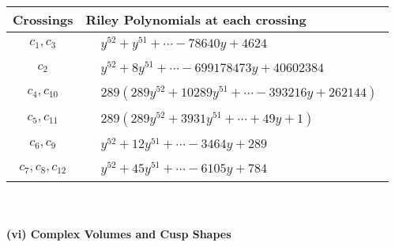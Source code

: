 \documentclass[1p]{elsarticle_modified}
\theoremstyle{definition}
\begin{document}
\begin{tabular}{m{50pt}|m{274pt}}
Crossings & \hspace{64pt}Riley Polynomials at each crossing \\
\hline $$\begin{aligned}c_{1},c_{3}\end{aligned}$$&$\begin{aligned}
&y^{52}+y^{51}+\cdots-78640 y+4624
\end{aligned}$\\
\hline $$\begin{aligned}c_{2}\end{aligned}$$&$\begin{aligned}
&y^{52}+8 y^{51}+\cdots-699178473 y+40602384
\end{aligned}$\\
\hline $$\begin{aligned}c_{4},c_{10}\end{aligned}$$&$\begin{aligned}
&289(289 y^{52}+10289 y^{51}+\cdots-393216 y+262144)
\end{aligned}$\\
\hline $$\begin{aligned}c_{5},c_{11}\end{aligned}$$&$\begin{aligned}
&289(289 y^{52}+3931 y^{51}+\cdots+49 y+1)
\end{aligned}$\\
\hline $$\begin{aligned}c_{6},c_{9}\end{aligned}$$&$\begin{aligned}
&y^{52}+12 y^{51}+\cdots-3464 y+289
\end{aligned}$\\
\hline $$\begin{aligned}c_{7},c_{8},c_{12}\end{aligned}$$&$\begin{aligned}
&y^{52}+45 y^{51}+\cdots-6105 y+784
\end{aligned}$\\
\hline
\end{tabular}\\~\\
\newpage\flushleft \textbf{(vi) Complex Volumes and Cusp Shapes}
\end{document}

